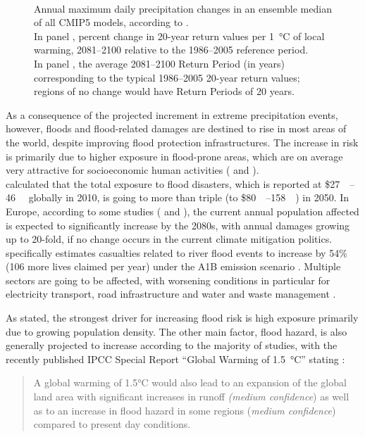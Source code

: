 \begin{figure}
\begin{subfigure}{.475\textwidth}
    \end{subfigure}\\
    \decoRule
    \caption[Projected changes in extreme precipitation from IPCC AR5]{Annual maximum daily precipitation changes in an ensemble median of all CMIP5 models, according to \citet[section 12.4.5.5, figure 12.27]{IPCC2013}. \\
    In panel , percent change in 20-year return values per \SI{1}{\celsius} of local warming, 2081--2100 relative to the 1986--2005 reference period.\\
    In panel , the average 2081--2100 Return Period (in years) corresponding to the typical 1986--2005 20-year return values; regions of no change would have Return Periods of 20 years.
} \label{fig:ipcc_extreme_pr}
\end{figure}
As a consequence of the projected increment in extreme precipitation events, however, floods and flood-related damages are destined to rise in most areas of the world, despite improving flood protection infrastructures. The increase in risk is primarily due to higher exposure in flood-prone areas, which are on average very attractive for socioeconomic human activities (\cite{MunichRE2015, Kron2005, Hirabayashi2009, Mitchell2003, Barredo2009, Alfieri2016} and \cite[][section 3.4.8]{Aalst2014}).\\
\citet{Jongman2012} calculated that the total exposure to flood disasters, which is reported at \$\SIrange{27}{46}{\tera\nothing} globally in 2010, is going to more than triple (to \$\SIrange{80}{158}{\tera\nothing}) in 2050. In Europe, according to some studies ( \cite{Rojas2013, Alfieri2015, Forzieri2017} and \cite[][section 23.3.1.2]{IPCCAR5WG2_23}), the current annual population affected is expected to significantly increase by the 2080s, with annual damages growing up to 20-fold, if no change occurs in the current climate mitigation politics.
\citet{Forzieri2017} specifically estimates casualties related to river flood events to increase by 54\% (106 more lives claimed per year) under the A1B emission scenario \citep{IPCC2000SRES}. Multiple sectors are going to be affected, with worsening conditions in particular for electricity transport, road infrastructure and water and waste management \citep{Forzieri2018}.

As stated, the strongest driver for increasing flood risk is high exposure primarily due to growing population density. The other main factor, flood hazard, is also generally projected to increase according to the majority of studies, with the recently published IPCC Special Report ``Global Warming of  \SI{1.5}{\celsius}'' stating \citep[][section 3.3.5]{IPCC2018}: 
\blockquote{A global warming of 1.5°C would also lead to an expansion of the global land area with significant increases in runoff \textit{(medium confidence}) as well as to an increase in flood hazard in some regions (\textit{medium confidence}) compared to present day conditions.}

